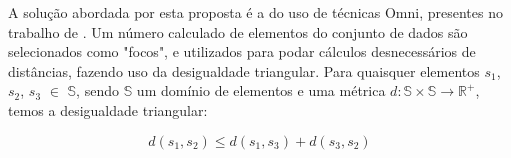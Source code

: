 

A solução abordada por esta proposta é a do uso de técnicas Omni, presentes no trabalho de \cite{Traina2001}. Um número calculado de elementos do conjunto de dados são selecionados como "focos", e utilizados para
podar cálculos desnecessários de distâncias, fazendo uso da desigualdade triangular. Para quaisquer elementos $s_1$, $s_2$, $s_3$ $\in$ $\mathbb{S}$, sendo $\mathbb{S}$ um domínio de elementos
e uma métrica $d : \mathbb{S} \times \mathbb{S} \rightarrow \mathbb{R^+}$, temos a desigualdade triangular:

\begin{equation} \label{eq:destri}
		d(s_1,s_2) \leq d(s_1,s_3) + d(s_3,s_2)
\end{equation}

% 
% 
% 

